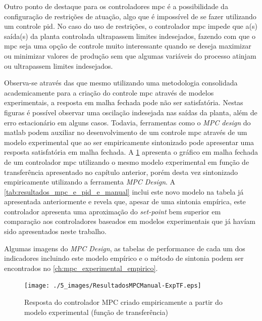 Outro ponto de destaque para os controladores \acrshort{mpc} é a possibilidade da configuração de
restrições de atuação, algo que é impossível de se fazer utilizando um controle \acrshort{pid}.
No caso do uso de restrições, o controlador \acrshort{mpc} impede que a(s) saída(s) da planta controlada
ultrapassem limites indesejados, fazendo com que o \acrshort{mpc} seja uma opção de controle muito
interessante quando se deseja maximizar ou minimizar valores de produção sem que algumas variáveis
do processo atinjam ou ultrapassem limites indesejados.

Observa-se através das  que mesmo utilizando
uma metodologia consolidada academicamente para a criação do controle \acrshort{mpc} através de modelos
experimentais, a resposta em malha fechada pode não ser satisfatória. Nestas figuras é possível 
observar uma oscilação indesejada nas saídas da planta, além de erro estacionário em alguns casos.
Todavia, ferramentas como o \textit{MPC design} do \acrshort{matlab} podem auxiliar no desenvolvimento
de um controle \acrshort{mpc} através de um modelo experimental que ao ser empiricamente sintonizado
pode apresentar uma resposta satisfatória em malha fechada. A \cref{fig:resultadosmpcmanual-exptf}
apresenta o gráfico em malha fechada de um controlador \acrshort{mpc} utilizando o mesmo modelo experimental em
função de transferência apresentado no capítulo anterior, porém desta vez sintonizado empiricamente utilizando
a ferramenta \textit{MPC Design}. A \cref{tab:resultados_mpc_e_pid_e_manual} inclui este novo modelo 
na tabela já apresentada anteriormente e revela que, apesar de uma sintonia empírica, este controlador
apresenta uma aproximação do \textit{set-point} bem superior em comparação aos controladores baseados em 
modelos experimentais que já havíam sido apresentados neste trabalho.

Algumas imagens do \textit{MPC Design}, as tabelas de performance de cada um dos indicadores
incluindo este modelo empírico e o método de sintonia podem ser encontrados no \cref{ch:mpc_experimental_empirico}.

\begin{figure}[!h]
	\caption{Resposta do controlador MPC criado empiricamente a partir do modelo experimental (função de transferência)}
	\begin{center}
		\texttt{[image: ./5\_images/ResultadosMPCManual-ExpTF.eps]} 
		\label{fig:resultadosmpcmanual-exptf}
	\end{center}
	\centering
\end{figure}


